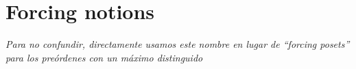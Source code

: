 \section{Forcing notions}\label{sec:forcing-posets}
\textit{Para no confundir, directamente usamos este nombre en lugar de
  ``forcing posets'' para los preórdenes con un máximo distinguido}





